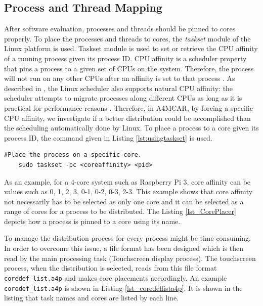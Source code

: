 \subsection{Process and Thread Mapping}
After software evaluation, processes and threads should be pinned to cores properly. To place the processes and threads to cores, the \textit{taskset} module of the Linux platform is used. Taskset module \cite{taskset} is used to set or retrieve the CPU affinity of a running process given its process ID. CPU affinity is a scheduler property that pins a process to a given set of CPUs on the system. Therefore, the process will not run on any other CPUs after an affinity is set to that process \cite{taskset}. As described in \cite{taskset}, the Linux scheduler also supports natural CPU affinity: the scheduler attempts to migrate processes along different CPUs as long as it is practical for performance reasons \cite{taskset}. Therefore, in A4MCAR, by forcing a specific CPU affinity, we investigate if a better distribution could be accomplished than the scheduling automatically done by Linux. To place a process to a core given its process ID, the command given in Listing \ref{lst:usingtaskset} is used.

\begin{lstlisting}[caption={Using taskset},label={lst:usingtaskset},style=bash]
	#Place the process on a specific core.
	sudo taskset -pc <coreaffinity> <pid>
\end{lstlisting}

As an example, for a 4-core system such as Raspberry Pi 3, core affinity can be values such as 0, 1, 2, 3, 0-1, 0-2, 0-3, 2-3. This example shows that core affinity not necessarily has to be selected as only one core and it can be selected as a range of cores for a process to be distributed. The Listing \ref{lst_CorePlacer} depicts how a process is pinned to a core using its name.
\newpage


To manage the distribution process for every process might be time consuming. In order to overcome this issue, a file format has been designed which is then read by the main processing task (Touchscreen display process). The touchscreen process, when the distribution is selected, reads from this file format \texttt{coredef\texttt{\_}list.a4p} and makes core placements accordingly. An example \texttt{coredef\texttt{\_}list.a4p} is shown in Listing \ref{lst_coredeflista4p}. It is shown in the listing that task names and cores are listed by each line.


